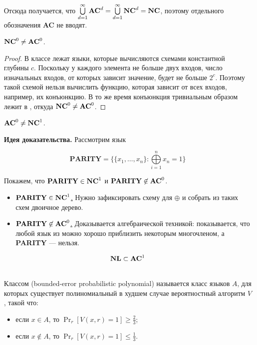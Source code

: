 \begin{note} Отсюда получается, что $\bigcup\limits_{d=1}^\infty \textbf{$\mathbf{AC}^{d}$} = \bigcup\limits_{d=1}^\infty \textbf{$\mathbf{NC}^{d}$} = \textbf{NC}$, поэтому отдельного обозначения \textbf{AC} не вводят.
\end{note}

\begin{statement}
$\textbf{$\mathbf{NC}^{0}$} \neq \textbf{$\mathbf{AC}^{0}$}$.
\end{statement}

\begin{proof}
В классе  лежат языки, которые вычисляются схемами константной глубины $c$. Поскольку у каждого элемента не больше  двух входов, число изначальных входов, от которых зависит значение, будет не больше $2^c$. Поэтому такой схемой нельзя вычислить функцию, которая зависит от всех входов, например, их конъюнкцию. В то же время конъюнкция тривиальным образом лежит в , откуда $\textbf{$\mathbf{NC}^{0}$} \neq \textbf{$\mathbf{AC}^{0}$}$.
\end{proof}

\begin{theorem}
$\textbf{$\mathbf{AC}^{0}$} \neq \textbf{$\mathbf{NC}^{1}$}$.
\end{theorem}

\textbf{Идея доказательства.} Рассмотрим язык

$$\textbf{PARITY} = \{\{x_1, \ldots, x_n\} : \bigoplus\limits_{i=1}^n x_n = 1\}$$

Покажем, что \mbox{$\textbf{PARITY} \in \textbf{$\mathbf{NC}^{1}$}$} и $\textbf{PARITY} \not\in \textbf{$\mathbf{AC}^{0}$}$.

\begin{itemize}
    \item \underline{$\textbf{PARITY} \in \textbf{$\mathbf{NC}^{1}$}$.} Нужно зафиксировать схему для $\oplus$ и собрать из таких схем двоичное дерево.
    \item \underline{$\textbf{PARITY} \not\in \textbf{$\mathbf{AC}^{0}$}$.} Доказывается алгебраической техникой: показывается, что любой язык из  можно хорошо приблизить некоторым многочленом, а \textbf{PARITY} --- нельзя.
\end{itemize}

\begin{theorem}
$$
\textbf{NL} \subset \textbf{$\mathbf{AC}^{1}$}
$$
\end{theorem}

\subsection{\bpp}

\begin{definition} Классом \bpp (bounded-error probabilistic polynomial) называется класс языков $A$, для которых существует полиномиальный в худшем случае вероятностный алгоритм $V$, такой что:

\begin{itemize}
    \item если $x \in A$, то $\Pr_r[V(x, r) = 1] \geq \frac{2}{3}$;
    \item если $x \not\in A$, то $\Pr_r[V(x, r) = 1] \leq \frac{1}{3}$.
\end{itemize}
\end{definition}

